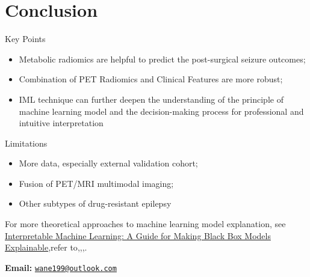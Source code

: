 \documentclass[
  11pt,
  ignorenonframetext,
  fontset=fandol]{beamer}
\providecommand{\tightlist}{%
  \setlength{\itemsep}{0pt}\setlength{\parskip}{0pt}}
\begin{document}
\hypertarget{conclusion}{%
\section{Conclusion}\label{conclusion}}

\begin{frame}{Key Points}
\protect\hypertarget{key-points}{}
\begin{itemize}
\tightlist
\item
  Metabolic radiomics are helpful to predict the post-surgical seizure
  outcomes;
\item
  Combination of PET Radiomics and Clinical Features are more robust;
\item
  IML technique can further deepen the understanding of the principle of
  machine learning model and the decision-making process for
  professional and intuitive interpretation
\end{itemize}
\end{frame}

\begin{frame}{Limitations}
\protect\hypertarget{limitations}{}
\begin{itemize}
\tightlist
\item
  More data, especially external validation cohort;
\item
  Fusion of PET/MRI multimodal imaging;
\item
  Other subtypes of drug-resistant epilepsy
\end{itemize}
\end{frame}

\begin{frame}{}
\protect\hypertarget{section}{}
For more theoretical approaches to machine learning model explanation,
see
\href{https://christophm.github.io/interpretable-ml-book/}{Interpretable
Machine Learning: A Guide for Making Black Box Models Explainable},refer
to\citep{beghi2019global},\citep{rajpurkar2021deep},\citep{mlr3book},\citep{molnar2022}.

\bigskip

\textbf{Email:}
\href{mailto:wane199@outlook.com}{\nolinkurl{wane199@outlook.com}}
\end{frame}
\end{document}
